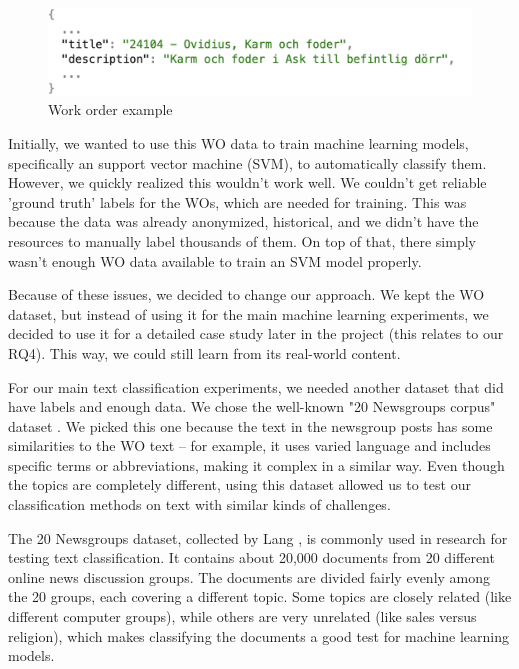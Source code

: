 \begin{figure}[h!]
    \centering
    \includegraphics[width=1\linewidth]{img/fig4.png}
    \caption{Work order example}
    \label{fig:enter-label}
\end{figure}

Initially, we wanted to use this WO data to train machine learning models, specifically an support vector machine (SVM), to automatically classify them. However, we quickly realized this wouldn't work well. We couldn't get reliable 'ground truth' labels for the WOs, which are needed for training. This was because the data was already anonymized, historical, and we didn't have the resources to manually label thousands of them. On top of that, there simply wasn't enough WO data available to train an SVM model properly.

Because of these issues, we decided to change our approach. We kept the WO dataset, but instead of using it for the main machine learning experiments, we decided to use it for a detailed case study later in the project (this relates to our RQ4). This way, we could still learn from its real-world content.

For our main text classification experiments, we needed another dataset that did have labels and enough data. We chose the well-known "20 Newsgroups corpus" dataset \cite{Lang95}. We picked this one because the text in the newsgroup posts has some similarities to the WO text -- for example, it uses varied language and includes specific terms or abbreviations, making it complex in a similar way. Even though the topics are completely different, using this dataset allowed us to test our classification methods on text with similar kinds of challenges.

The 20 Newsgroups dataset, collected by Lang \cite{Lang95}, is commonly used in research for testing text classification. It contains about 20,000 documents from 20 different online news discussion groups. The documents are divided fairly evenly among the 20 groups, each covering a different topic. Some topics are closely related (like different computer groups), while others are very unrelated (like sales versus religion), which makes classifying the documents a good test for machine learning models.

